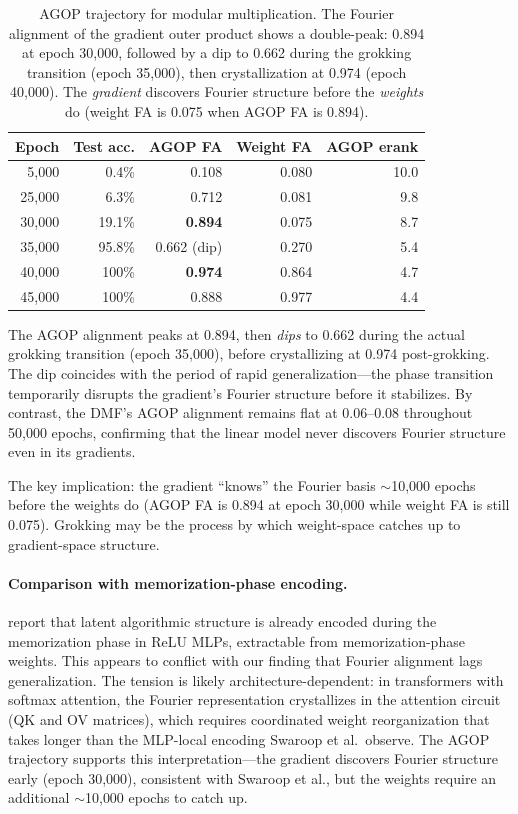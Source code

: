 \begin{table}[t]
\centering
\small
\begin{tabular}{rrrrr}
\toprule
Epoch & Test acc. & AGOP FA & Weight FA & AGOP erank \\
\midrule
5{,}000   & 0.4\%   & 0.108 & 0.080 & 10.0 \\
25{,}000  & 6.3\%   & 0.712 & 0.081 & 9.8 \\
30{,}000  & 19.1\%  & \textbf{0.894} & 0.075 & 8.7 \\
35{,}000  & 95.8\%  & 0.662 (dip) & 0.270 & 5.4 \\
40{,}000  & 100\%   & \textbf{0.974} & 0.864 & 4.7 \\
45{,}000  & 100\%   & 0.888 & 0.977 & 4.4 \\
\bottomrule
\end{tabular}
\caption{AGOP trajectory for modular multiplication. The Fourier alignment of
the gradient outer product shows a double-peak: 0.894 at epoch 30{,}000,
followed by a dip to 0.662 during the grokking transition (epoch 35{,}000),
then crystallization at 0.974 (epoch 40{,}000). The \emph{gradient}
discovers Fourier structure before the \emph{weights} do (weight FA is
0.075 when AGOP FA is 0.894).}
\label{tab:agop}
\end{table}

The AGOP alignment peaks at 0.894, then \emph{dips} to 0.662 during the
actual grokking transition (epoch 35{,}000), before crystallizing at 0.974
post-grokking. The dip coincides with the period of rapid generalization---the
phase transition temporarily disrupts the gradient's Fourier structure before
it stabilizes. By contrast, the DMF's AGOP alignment remains flat at
0.06--0.08 throughout 50{,}000 epochs, confirming that the linear model never
discovers Fourier structure even in its gradients.

The key implication: the gradient ``knows'' the Fourier basis $\sim$10{,}000
epochs before the weights do (AGOP FA is 0.894 at epoch 30{,}000 while weight
FA is still 0.075). Grokking may be the process by which weight-space catches
up to gradient-space structure.

\paragraph{Comparison with memorization-phase encoding.}
\citet{swaroop2026latent} report that latent algorithmic structure is already
encoded during the memorization phase in ReLU MLPs, extractable from
memorization-phase weights. This appears to conflict with our finding that
Fourier alignment lags generalization. The tension is likely
architecture-dependent: in transformers with softmax attention, the Fourier
representation crystallizes in the attention circuit (QK and OV matrices),
which requires coordinated weight reorganization that takes longer than the
MLP-local encoding Swaroop et al.\ observe. The AGOP trajectory supports
this interpretation---the gradient discovers Fourier structure early (epoch
30{,}000), consistent with Swaroop et al., but the weights require an
additional $\sim$10{,}000 epochs to catch up.

